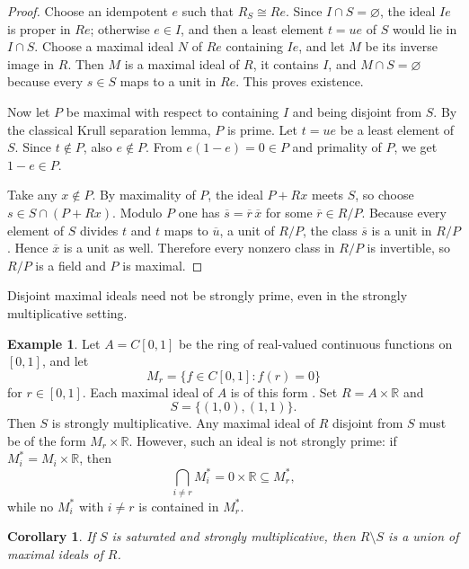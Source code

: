 \documentclass[11pt]{amsart}
\newtheorem{corollary}[theorem]{Corollary}
\theoremstyle{definition}
\newtheorem{example}[theorem]{Example}
\theoremstyle{remark}
\begin{document}
\begin{proof}
Choose an idempotent $e$ such that $R_S \cong Re$.
Since $I \cap S=\varnothing$, the ideal $Ie$ is proper in $Re$; otherwise $e \in I$, and then a least element $t=ue$ of $S$ would lie in $I \cap S$.
Choose a maximal ideal $N$ of $Re$ containing $Ie$, and let $M$ be its inverse image in $R$.
Then $M$ is a maximal ideal of $R$, it contains $I$, and $M \cap S=\varnothing$ because every $s \in S$ maps to a unit in $Re$.
This proves existence.

Now let $P$ be maximal with respect to containing $I$ and being disjoint from $S$.
By the classical Krull separation lemma, $P$ is prime.
Let $t=ue$ be a least element of $S$.
Since $t \notin P$, also $e \notin P$.
From $e(1-e)=0 \in P$ and primality of $P$, we get $1-e \in P$.

Take any $x \notin P$.
By maximality of $P$, the ideal $P+Rx$ meets $S$, so choose $s \in S \cap (P+Rx)$.
Modulo $P$ one has $\overline s=\overline r\,\overline x$ for some $\overline r \in R/P$.
Because every element of $S$ divides $t$ and $t$ maps to $\overline u$, a unit of $R/P$, the class $\overline s$ is a unit in $R/P$.
Hence $\overline x$ is a unit as well.
Therefore every nonzero class in $R/P$ is invertible, so $R/P$ is a field and $P$ is maximal.
\end{proof}

Disjoint maximal ideals need not be strongly prime, even in the strongly multiplicative setting.

\begin{example}\label{ex:max-not-strong}
Let $A=C[0,1]$ be the ring of real-valued continuous functions on $[0,1]$, and let
\[
M_r=\{f \in C[0,1] : f(r)=0\}
\]
for $r \in [0,1]$.
Each maximal ideal of $A$ is of this form \cite{Atiyah}.
Set $R=A \times \mathbb{R}$ and
\[
S=\{(1,0),(1,1)\}.
\]
Then $S$ is strongly multiplicative.
Any maximal ideal of $R$ disjoint from $S$ must be of the form $M_r \times \mathbb{R}$.
However, such an ideal is not strongly prime:
if $M_i^\ast=M_i \times \mathbb{R}$, then
\[
\bigcap_{i \neq r} M_i^\ast=0 \times \mathbb{R}\subseteq M_r^\ast,
\]
while no $M_i^\ast$ with $i \neq r$ is contained in $M_r^\ast$.
\end{example}

\begin{corollary}\label{cor:maxunion}
If $S$ is saturated and strongly multiplicative, then $R \setminus S$ is a union of maximal ideals of $R$.
\end{corollary}
\end{document}

